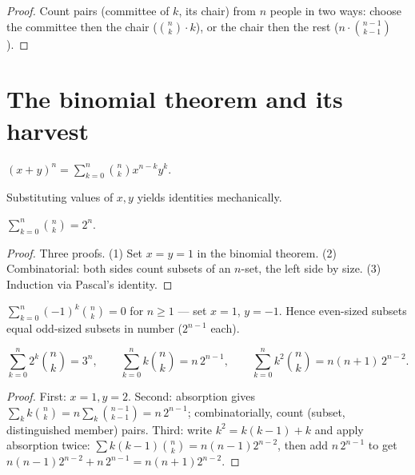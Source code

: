 \begin{proof}
Count pairs (committee of $k$, its chair) from $n$ people in two ways:
choose the committee then the chair ($\binom{n}{k} \cdot k$), or the chair
then the rest ($n \cdot \binom{n-1}{k-1}$).
\end{proof}

\section{The binomial theorem and its harvest}

\begin{theorem}
$\displaystyle (x+y)^{n} = \sum_{k=0}^{n} \binom{n}{k} x^{n-k} y^{k}$.
\end{theorem}

Substituting values of $x, y$ yields identities mechanically.

\begin{theorem}\label{thm:rowsum}
$\displaystyle\sum_{k=0}^{n} \binom{n}{k} = 2^{n}$.
\end{theorem}

\begin{proof}
Three proofs. (1) Set $x = y = 1$ in the binomial theorem.
(2) Combinatorial: both sides count subsets of an $n$-set, the left side by
size. (3) Induction via Pascal's identity.
\end{proof}

\begin{theorem}
$\displaystyle\sum_{k=0}^{n} (-1)^{k} \binom{n}{k} = 0$ for $n \geq 1$ ---
set $x = 1$, $y = -1$. Hence even-sized subsets equal odd-sized subsets in
number ($2^{n-1}$ each).
\end{theorem}

\begin{theorem}\label{thm:weighted}
\[
\sum_{k=0}^{n} 2^{k}\binom{n}{k} = 3^{n}, \qquad
\sum_{k=0}^{n} k\binom{n}{k} = n\,2^{n-1}, \qquad
\sum_{k=0}^{n} k^{2}\binom{n}{k} = n(n+1)\,2^{n-2}.
\]
\end{theorem}

\begin{proof}
First: $x=1, y=2$. Second: absorption gives
$\sum_k k\binom{n}{k} = n \sum_k \binom{n-1}{k-1} = n\,2^{n-1}$;
combinatorially, count (subset, distinguished member) pairs.
Third: write $k^2 = k(k-1) + k$ and apply absorption twice:
$\sum k(k-1)\binom{n}{k} = n(n-1)2^{n-2}$, then add $n\,2^{n-1}$ to get
$n(n-1)2^{n-2} + n\,2^{n-1} = n(n+1)2^{n-2}$.
\end{proof}

